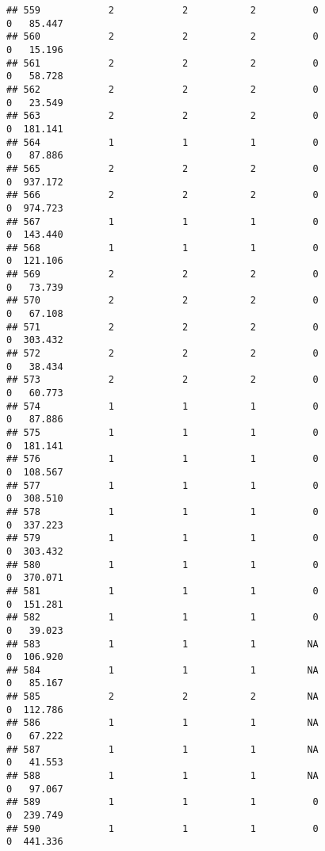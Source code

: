 \documentclass[
]{article}
\begin{document}
\begin{verbatim}
## 559            2            2           2          0                0   85.447
## 560            2            2           2          0                0   15.196
## 561            2            2           2          0                0   58.728
## 562            2            2           2          0                0   23.549
## 563            2            2           2          0                0  181.141
## 564            1            1           1          0                0   87.886
## 565            2            2           2          0                0  937.172
## 566            2            2           2          0                0  974.723
## 567            1            1           1          0                0  143.440
## 568            1            1           1          0                0  121.106
## 569            2            2           2          0                0   73.739
## 570            2            2           2          0                0   67.108
## 571            2            2           2          0                0  303.432
## 572            2            2           2          0                0   38.434
## 573            2            2           2          0                0   60.773
## 574            1            1           1          0                0   87.886
## 575            1            1           1          0                0  181.141
## 576            1            1           1          0                0  108.567
## 577            1            1           1          0                0  308.510
## 578            1            1           1          0                0  337.223
## 579            1            1           1          0                0  303.432
## 580            1            1           1          0                0  370.071
## 581            1            1           1          0                0  151.281
## 582            1            1           1          0                0   39.023
## 583            1            1           1         NA                0  106.920
## 584            1            1           1         NA                0   85.167
## 585            2            2           2         NA                0  112.786
## 586            1            1           1         NA                0   67.222
## 587            1            1           1         NA                0   41.553
## 588            1            1           1         NA                0   97.067
## 589            1            1           1          0                0  239.749
## 590            1            1           1          0                0  441.336

\end{verbatim}
\end{document}
